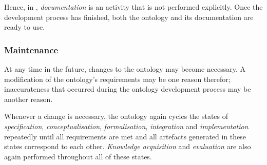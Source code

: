 Hence, in \methontology, \emph{documentation} is an activity that is not performed explicitly. Once the development process has finished, both the ontology and its documentation are ready to use. 

\subsubsection{Maintenance}

At any time in the future, changes to the ontology may become necessary. A modification of the ontology's requirements may be one reason therefor; inaccurateness that occurred during the ontology development process may be another reason.

Whenever a change is necessary, the ontology again cycles the states of \emph{specification}, \emph{conceptualisation}, \emph{formalisation}, \emph{integration} and \emph{implementation} repeatedly until all requirements are met and all artefacts generated in these states correspond to each other. \emph{Knowledge acquisition} and \emph{evaluation} are also again performed throughout all of these states.

